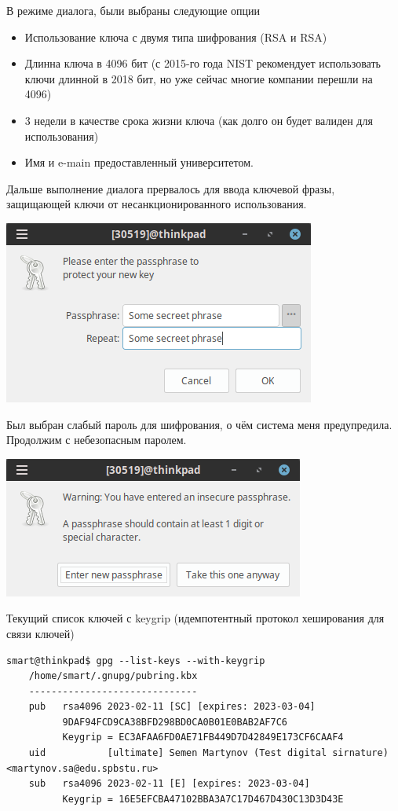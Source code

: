 В режиме диалога, были выбраны следующие опции
\begin{itemize}
    \item Использование ключа с двумя типа шифрования (RSA и RSA)
    \item Длинна ключа в 4096 бит (с 2015-го года NIST рекомендует использовать ключи длинной в 2018 бит, но уже сейчас многие компании перешли на 4096)
    \item 3 недели в качестве срока жизни ключа (как долго он будет валиден для использования)
    \item Имя и e-main предоставленный университетом.
\end{itemize}

Дальше выполнение диалога прервалось для ввода ключевой фразы, защищающей ключи от несанкционированного использования.
\begin{center}
\includegraphics[scale=0.8]{res/3.pass1.png}
\end{center}

Был выбран слабый пароль для шифрования, о чём система меня предупредила. Продолжим с небезопасным паролем.
\begin{center}
\includegraphics[scale=0.8]{res/3.pass2.png}
\end{center}

Текущий список ключей с keygrip (идемпотентный протокол хеширования для связи ключей)
\begin{Verbatim}[frame=single,breaklines=true,breakanywhere=true]
    smart@thinkpad$ gpg --list-keys --with-keygrip
    /home/smart/.gnupg/pubring.kbx
    ------------------------------
    pub   rsa4096 2023-02-11 [SC] [expires: 2023-03-04]
          9DAF94FCD9CA38BFD298BD0CA0B01E0BAB2AF7C6
          Keygrip = EC3AFAA6FD0AE71FB449D7D42849E173CF6CAAF4
    uid           [ultimate] Semen Martynov (Test digital sirnature) <martynov.sa@edu.spbstu.ru>
    sub   rsa4096 2023-02-11 [E] [expires: 2023-03-04]
          Keygrip = 16E5EFCBA47102BBA3A7C17D467D430C13D3D43E
\end{Verbatim}

